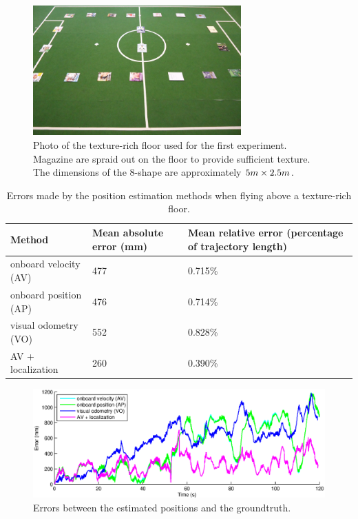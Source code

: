 \begin{figure}[htb!]
\centering
\includegraphics[width=8cm]{images/exp1-floor.jpg}
\caption{Photo of the texture-rich floor used for the first experiment. Magazine are spraid out on the floor to provide sufficient texture. The dimensions of the 8-shape are approximately $5\small{m} \times 2.5\small{m}$.}
\label{fig:exp1-floor}
\end{figure}

\begin{table}[htb!]
    \centering
    \begin{tabular}
        { | l | l | l | } 
	\hline
	Method & Mean absolute error (\small{mm}) & Mean relative error (percentage of trajectory length) \\
        \hline
        onboard velocity (AV) & 477 & 0.715\% \\
	onboard position (AP) & 476 & 0.714\% \\
	visual odometry (VO) & 552 & 0.828\% \\
	AV + localization & 260 & 0.390\% \\
	\hline
    \end{tabular}
    \caption{Errors made by the position estimation methods when flying above a texture-rich floor.}
    \label{tab:res_mapping}
\end{table}

\begin{figure}[htb!]
\centering
\includegraphics[width=\linewidth]{images/exp1-run13-error.eps}
\caption{Errors between the estimated positions and the groundtruth.}
\label{fig:exp1-texture-error}
\end{figure}

